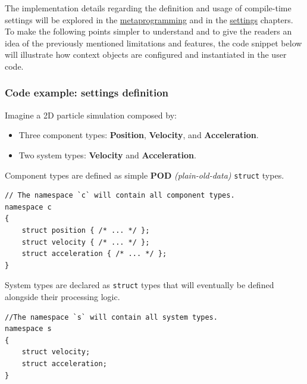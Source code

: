 \documentclass[twoside, 12pt, a4paper, openany]{book}
\begin{document}
The implementation details regarding the definition and usage of
compile-time settings will be explored in the
\protect\hyperlink{chap_ecst_metaprogramming}{metaprogramming} and in
the \protect\hyperlink{chap_ecst_compilemtime}{settings} chapters. To
make the following points simpler to understand and to give the readers
an idea of the previously mentioned limitations and features, the code
snippet below will illustrate how context objects are configured and
instantiated in the user code.

\hypertarget{code_example_settings_definition}{\subsubsection{Code
example: settings definition}\label{code_example_settings_definition}}

Imagine a 2D particle simulation composed by:

\begin{itemize}
\item
  Three component types: \textbf{Position}, \textbf{Velocity}, and
  \textbf{Acceleration}.
\item
  Two system types: \textbf{Velocity} and \textbf{Acceleration}.
\end{itemize}

Component types are defined as simple \textbf{POD}
\emph{(plain-old-data)}
\texttt{struct}
types.

\begin{verbatim}
// The namespace `c` will contain all component types.
namespace c
{
    struct position { /* ... */ };
    struct velocity { /* ... */ };
    struct acceleration { /* ... */ };
}
\end{verbatim}

System types are declared as
\texttt{struct}
types that will eventually be defined alongside their processing logic.

\begin{verbatim}
//The namespace `s` will contain all system types.
namespace s
{
    struct velocity;
    struct acceleration;
}
\end{verbatim}
\end{document}
